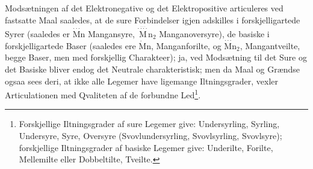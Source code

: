 \documentclass[12pt,a4paper]{book}
\begin{document}
Modsætningen af det Elektronegative og det Elektropositive
articuleres ved fastsatte Maal saaledes, at de sure
Forbindelser igjen adskilles i forskjelligartede Syrer (saaledes
er $\stackrel{\cdot\cdot\cdot}{\mathrm{M}}\mathrm{n}$ Mangansyre,
$\stackrel{\stackrel{\cdot\cdot\cdot}{\cdot\cdot\cdot\cdot}}{\mathrm{M}}\mathrm{n}_2$
Manganoversyre), de basiske i forskjelligartede
Baser (saaledes ere $\dot{\mathrm{M}}\mathrm{n}$, Manganforilte, og
$\stackrel{\cdot\cdot\cdot}{\mathrm{M}}\mathrm{n}_2$,
Mangantveilte, begge Baser, men med forskjellig Charakteer);
ja, ved Modsætning til det Sure og det Basiske bliver endog
det Neutrale charakteristisk; men da Maal og Grændse ogsaa
sees deri, at ikke alle Legemer have ligemange Iltningsgrader,
vexler Articulationen med Qvaliteten af de forbundne
Led\footnote{Forskjellige Iltningsgrader af sure Legemer give: Undersyrling,
Syrling, Undersyre, Syre, Oversyre (Svovlundersyrling, Svovlsyrling,
Svovlsyre); forskjellige Iltningsgrader af basiske Legemer
give: Underilte, Forilte, Mellemilte eller Dobbeltilte, Tveilte.}.
\setcounter{footnote}{0}
\end{document}
